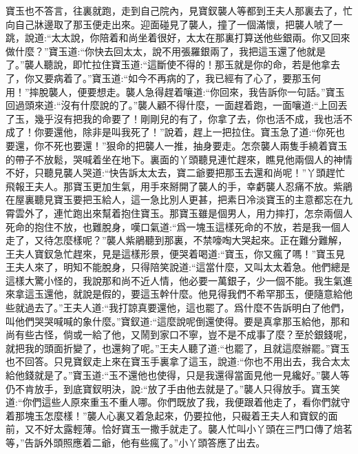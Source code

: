 \begin{parag}
    寶玉也不答言，往裏就跑，走到自己院內，見寶釵襲人等都到王夫人那裏去了，忙向自己牀邊取了那玉便走出來。迎面碰見了襲人，撞了一個滿懷，把襲人唬了一跳，說道:“太太說，你陪着和尚坐着很好，太太在那裏打算送他些銀兩。你又回來做什麼？”寶玉道:“你快去回太太，說不用張羅銀兩了，我把這玉還了他就是了。”襲人聽說，即忙拉住寶玉道:“這斷使不得的！那玉就是你的命，若是他拿去了，你又要病着了。”寶玉道:“如今不再病的了，我已經有了心了，要那玉何用！”摔脫襲人，便要想走。襲人急得趕着嚷道:“你回來，我告訴你一句話。”寶玉回過頭來道:“沒有什麼說的了。”襲人顧不得什麼，一面趕着跑，一面嚷道:“上回丟了玉，幾乎沒有把我的命要了！剛剛兒的有了，你拿了去，你也活不成，我也活不成了！你要還他，除非是叫我死了！”說着，趕上一把拉住。寶玉急了道:“你死也要還，你不死也要還！”狠命的把襲人一推，抽身要走。怎奈襲人兩隻手繞着寶玉的帶子不放鬆，哭喊着坐在地下。裏面的丫頭聽見連忙趕來，瞧見他兩個人的神情不好，只聽見襲人哭道:“快告訴太太去，寶二爺要把那玉去還和尚呢！”丫頭趕忙飛報王夫人。那寶玉更加生氣，用手來掰開了襲人的手，幸虧襲人忍痛不放。紫鵑在屋裏聽見寶玉要把玉給人，這一急比別人更甚，把素日冷淡寶玉的主意都忘在九霄雲外了，連忙跑出來幫着抱住寶玉。那寶玉雖是個男人，用力摔打，怎奈兩個人死命的抱住不放，也難脫身，嘆口氣道:“爲一塊玉這樣死命的不放，若是我一個人走了，又待怎麼樣呢？”襲人紫鵑聽到那裏，不禁嚎啕大哭起來。正在難分難解，王夫人寶釵急忙趕來，見是這樣形景，便哭着喝道:“寶玉，你又瘋了嗎！”寶玉見王夫人來了，明知不能脫身，只得陪笑說道:“這當什麼，又叫太太着急。他們總是這樣大驚小怪的，我說那和尚不近人情，他必要一萬銀子，少一個不能。我生氣進來拿這玉還他，就說是假的，要這玉幹什麼。他見得我們不希罕那玉，便隨意給他些就過去了。”王夫人道:“我打諒真要還他，這也罷了。爲什麼不告訴明白了他們，叫他們哭哭喊喊的象什麼。”寶釵道:“這麼說呢倒還使得。要是真拿那玉給他，那和尚有些古怪，倘或一給了他，又鬧到家口不寧，豈不是不成事了麼？至於銀錢呢，就把我的頭面折變了，也還夠了呢。”王夫人聽了道:“也罷了，且就這麼辦罷。”寶玉也不回答。只見寶釵走上來在寶玉手裏拿了這玉，說道:“你也不用出去，我合太太給他錢就是了。”寶玉道:“玉不還他也使得，只是我還得當面見他一見纔好。”襲人等仍不肯放手，到底寶釵明決，說:“放了手由他去就是了。”襲人只得放手。寶玉笑道:“你們這些人原來重玉不重人哪。你們既放了我，我便跟着他走了，看你們就守着那塊玉怎麼樣！”襲人心裏又着急起來，仍要拉他，只礙着王夫人和寶釵的面前，又不好太露輕薄。恰好寶玉一撒手就走了。襲人忙叫小丫頭在三門口傳了焙茗等，”告訴外頭照應着二爺，他有些瘋了。”小丫頭答應了出去。
\end{parag}



